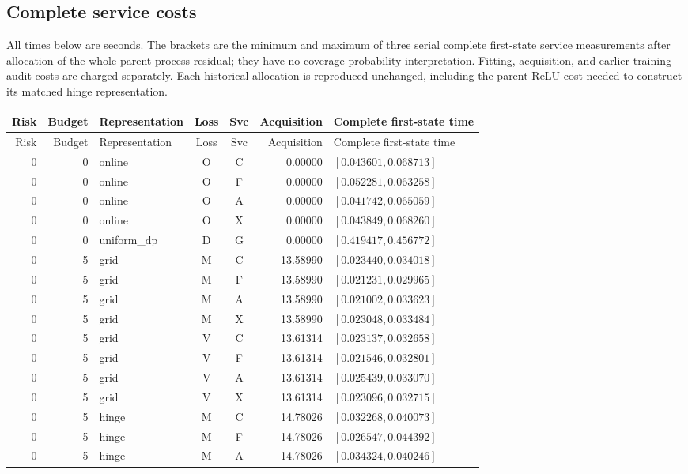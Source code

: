 \subsection{Complete service costs}
All times below are seconds. The brackets are the minimum and maximum of three serial complete first-state service measurements after allocation of the whole parent-process residual; they have no coverage-probability interpretation. Fitting, acquisition, and earlier training-audit costs are charged separately. Each historical allocation is reproduced unchanged, including the parent ReLU cost needed to construct its matched hinge representation.
\begingroup\scriptsize\setlength{\tabcolsep}{4pt}
\begin{longtable}{r r l c c r l}
\hline
Risk & Budget & Representation & Loss & Svc & Acquisition & Complete first-state time \\
\hline\endfirsthead
\hline Risk & Budget & Representation & Loss & Svc & Acquisition & Complete first-state time \\ \hline\endhead
0 & 0 & online & O & C & 0.00000 & $[0.043601,0.068713]$ \\
0 & 0 & online & O & F & 0.00000 & $[0.052281,0.063258]$ \\
0 & 0 & online & O & A & 0.00000 & $[0.041742,0.065059]$ \\
0 & 0 & online & O & X & 0.00000 & $[0.043849,0.068260]$ \\
0 & 0 & uniform\_dp & D & G & 0.00000 & $[0.419417,0.456772]$ \\
0 & 5 & grid & M & C & 13.58990 & $[0.023440,0.034018]$ \\
0 & 5 & grid & M & F & 13.58990 & $[0.021231,0.029965]$ \\
0 & 5 & grid & M & A & 13.58990 & $[0.021002,0.033623]$ \\
0 & 5 & grid & M & X & 13.58990 & $[0.023048,0.033484]$ \\
0 & 5 & grid & V & C & 13.61314 & $[0.023137,0.032658]$ \\
0 & 5 & grid & V & F & 13.61314 & $[0.021546,0.032801]$ \\
0 & 5 & grid & V & A & 13.61314 & $[0.025439,0.033070]$ \\
0 & 5 & grid & V & X & 13.61314 & $[0.023096,0.032715]$ \\
0 & 5 & hinge & M & C & 14.78026 & $[0.032268,0.040073]$ \\
0 & 5 & hinge & M & F & 14.78026 & $[0.026547,0.044392]$ \\
0 & 5 & hinge & M & A & 14.78026 & $[0.034324,0.040246]$ \\

\end{longtable}

